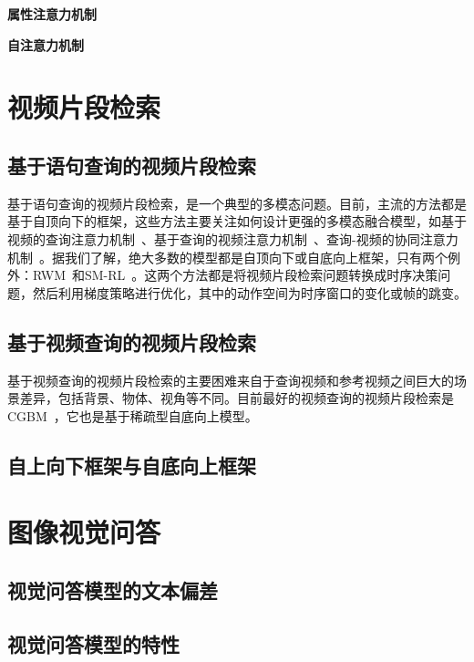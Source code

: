 \textbf{属性注意力机制}



\textbf{自注意力机制}












\section{视频片段检索}

\subsection{基于语句查询的视频片段检索}
基于语句查询的视频片段检索，是一个典型的多模态问题。目前，主流的方法都是基于自顶向下的框架，这些方法主要关注如何设计更强的多模态融合模型，如基于视频的查询注意力机制~\cite{liu2018attentive}、基于查询的视频注意力机制~\cite{liu2018cross}、查询-视频的协同注意力机制~\cite{chen2018temporally,chen2019localizing,yuan2019find}。据我们了解，绝大多数的模型都是自顶向下或自底向上框架，只有两个例外：RWM~\cite{he2019read}和SM-RL~\cite{wang2019language}。这两个方法都是将视频片段检索问题转换成时序决策问题，然后利用梯度策略进行优化，其中的动作空间为时序窗口的变化或帧的跳变。


\subsection{基于视频查询的视频片段检索}
基于视频查询的视频片段检索的主要困难来自于查询视频和参考视频之间巨大的场景差异，包括背景、物体、视角等不同。目前最好的视频查询的视频片段检索是CGBM~\cite{feng2018video}，它也是基于稀疏型自底向上模型。


\subsection{自上向下框架与自底向上框架}







\section{图像视觉问答}


\subsection{视觉问答模型的文本偏差}


\subsection{视觉问答模型的特性}

